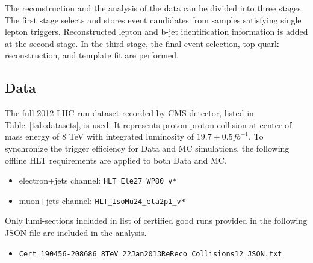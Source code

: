 
The reconstruction and the analysis of the data can be divided into three stages.  The first stage selects and stores event candidates from samples satisfying single lepton triggers.  Reconstructed lepton and b-jet identification information is added at the second stage.  In the third stage, the final event selection, top quark reconstruction, and template fit are performed.
  
\subsection{Data}
The full 2012 LHC run dataset recorded by CMS detector, listed in Table~\ref{tab:datasets}, is used.  It represents proton proton collision at center of mass energy of 8 TeV with integrated luminosity of $19.7 \pm 0.5 fb^{-1}$.  
To synchronize the trigger efficiency for Data and MC simulations, the following offline HLT requirements are applied to both Data and MC.
\begin{itemize}
\item electron+jets channel: \texttt{HLT\_Ele27\_WP80\_v*}
\item muon+jets channel: \texttt{HLT\_IsoMu24\_eta2p1\_v*}
\end{itemize}
Only lumi-sections included in list of certified good runs provided in the following JSON file are included in the analysis. 
\begin{itemize}
\item \texttt{Cert\_190456-208686\_8TeV\_22Jan2013ReReco\_Collisions12\_JSON.txt}
\end{itemize}

